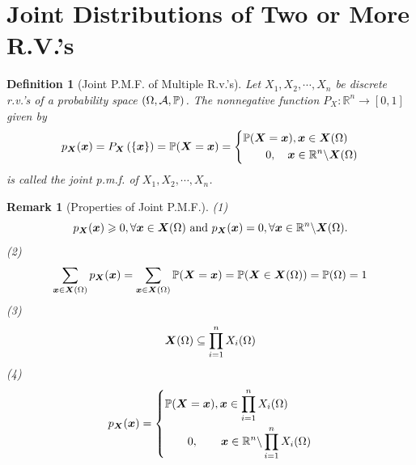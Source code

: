 \documentclass[openany,12pt]{book}
\newtheorem{remark}{Remark}[chapter]
\newtheorem{definition}{Definition}[chapter]
\begin{document}
\section{Joint Distributions of Two or More R.V.'s}

\begin{definition}[Joint P.M.F. of Multiple R.v.'s]
  Let $X_1, X_2, \cdots,X_n$ be discrete r.v.'s of a probability space $(\Omega,\mathcal{A},\mathbb{P})$. The nonnegative function $P_X:\mathbb{R}^n\to[0,1]$ given by
  \[p_{\bm{X}}(\bm{x})= P_{\bm{X}}\left( \left\{ \bm{x}\right\} \right)= \mathbb{P}(\bm{X} =\bm{x})= \left\{ \begin{aligned}
       & \mathbb{P}(\bm{X} =\bm{x}), \bm{x}\in\bm{X}(\Omega)                \\
       & \qquad0,\quad\bm{x}\in \mathbb{R}^{n}\backslash\bm{X}(\Omega) \\
    \end{aligned} \right.\]
  is called the joint p.m.f. of $X_1, X_2, \cdots,X_n$.
\end{definition}

\begin{remark}[Properties of Joint P.M.F.]
  (1)
  \[p_{\bm{X}}(\bm{x}) \geqslant 0, \forall \bm{x}\in \bm{X}( \Omega) ~\text{and}~\mathrm{ } p_{\bm{X}}(\bm{x})= 0, \forall\bm{x} \in \mathbb{R}^{n}\backslash \bm{X}(\Omega).\]
  (2)
  \[\sum_{\bm{x}\in \bm{X}(\Omega)}{p_{\bm{X}}(\bm{x})} = \sum_{\bm{x}\in \bm{X}(\Omega)}{\mathbb{P}(\bm{X}=\bm{x})} = \mathbb{P}(\bm{X} \in \bm{X}(\Omega))= \mathbb{P}( \Omega)= 1\]
  (3)
  \[\bm{X}(\Omega) \subseteq \prod_{i = 1}^{n}{X_{i}(\Omega)}\]
  (4)
  \[p_{\bm{X}}(\bm{x})= \left\{ \begin{aligned}
       & \mathbb{P}(\bm{X} =\bm{x}), \bm{x}\in\prod_{i = 1}^{n}X_{i}(\Omega)                     \\
       & \qquad0,\qquad\bm{x}  \in \mathbb{R}^{n}\backslash\prod_{i = 1}^{n}X_{i}( \Omega) \\
    \end{aligned} \right.\]
\end{remark}
\end{document}

